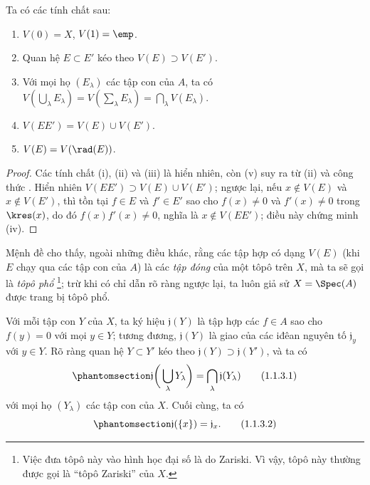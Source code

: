 \documentclass[oneside]{amsart}
\newcommand{\oldpage}[2][]{{\marginnote{\normalfont\textbf{#1}~|~#2}}\ignorespaces}
\let\EGAOriginalLabel\label
\renewcommand{\label}[1]{\phantomsection\EGAOriginalLabel{#1}}
\begin{document}
\begin{proposition}[1.1.2]
\label{I.1.1.2}
Ta có các tính chất sau:
\begin{enumerate}
  \item[{\rm(i)}] $V(0)=X$, $V(1)=\emp$.
  \item[{\rm(ii)}] Quan hệ $E\subset E'$ kéo theo $V(E)\supset V(E')$.
  \item[{\rm(iii)}] Với mọi họ $(E_\lambda)$ các tập con của $A$, ta có $V(\bigcup_\lambda E_\lambda)=V(\sum_\lambda E_\lambda)=\bigcap_\lambda V(E_\lambda)$.
  \item[{\rm(iv)}] $V(EE')=V(E)\cup V(E')$.
  \item[{\rm(v)}] $V(E)=V(\rad(E))$.
\end{enumerate}
\end{proposition}

\begin{proof}
Các tính chất (i), (ii) và (iii) là hiển nhiên, còn (v) suy ra từ (ii) và công thức .
Hiển nhiên $V(EE')\supset V(E)\cup V(E')$;
ngược lại, nếu $x\not\in V(E)$ và $x\not\in V(E')$, thì tồn tại $f\in E$ và $f'\in E'$ sao cho $f(x)\neq 0$ và $f'(x)\neq 0$ trong $\kres(x)$, do đó $f(x)f'(x)\neq 0$, nghĩa là $x\not\in V(EE')$; điều này chứng minh (iv).
\end{proof}

Mệnh đề  cho thấy, ngoài những điều khác, rằng các tập hợp có dạng $V(E)$ (khi $E$ chạy qua các tập con của $A$) là các \emph{tập đóng} của một tôpô trên $X$, mà ta sẽ gọi là \emph{tôpô phổ}
\footnote{Việc đưa tôpô này vào hình học đại số là do Zariski.
Vì vậy, tôpô này thường được gọi là ``tôpô Zariski'' của $X$.};
trừ khi có chỉ dẫn rõ ràng ngược lại, ta luôn giả sử $X=\Spec(A)$ được trang bị tôpô phổ.

\begin{env}[1.1.3]
\label{I.1.1.3}
\oldpage[I]{81}
Với mỗi tập con $Y$ của $X$, ta ký hiệu $\mathfrak{j}(Y)$ là tập hợp các $f\in A$ sao cho $f(y)=0$ với mọi $y\in Y$;
tương đương, $\mathfrak{j}(Y)$ là giao của các iđêan nguyên tố $\mathfrak{j}_y$ với $y\in Y$.
Rõ ràng quan hệ $Y\subset Y'$ kéo theo $\mathfrak{j}(Y)\supset\mathfrak{j}(Y')$, và ta có
\[
  \label{I.1.1.3.1}
  \mathfrak{j}\bigg(\bigcup_\lambda Y_\lambda\bigg)=\bigcap_\lambda\mathfrak{j}(Y_\lambda)
  \tag{1.1.3.1}
\]
với mọi họ $(Y_\lambda)$ các tập con của $X$.
Cuối cùng, ta có
\[
  \label{I.1.1.3.2}
  \mathfrak{j}(\{x\})=\mathfrak{j}_x.
  \tag{1.1.3.2}
\]
\end{env}
\end{document}

